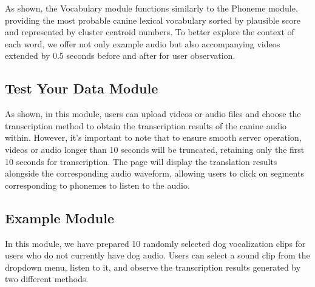 As  shown, the Vocabulary module functions similarly to the Phoneme module, providing the most probable canine lexical vocabulary sorted by plausible score and represented by cluster centroid numbers. To better explore the context of each word, we offer not only example audio but also accompanying videos extended by 0.5 seconds before and after for user observation.

\subsection{Test Your Data Module}

As  shown, in this module, users can upload videos or audio files and choose the transcription method to obtain the transcription results of the canine audio within. However, it's important to note that to ensure smooth server operation, videos or audio longer than 10 seconds will be truncated, retaining only the first 10 seconds for transcription. The page will display the translation results alongside the corresponding audio waveform, allowing users to click on segments corresponding to phonemes to listen to the audio.

\subsection{Example Module}

In this module, we have prepared 10 randomly selected dog vocalization clips for users who do not currently have dog audio. Users can select a sound clip from the dropdown menu, listen to it, and observe the transcription results generated by two different methods.

